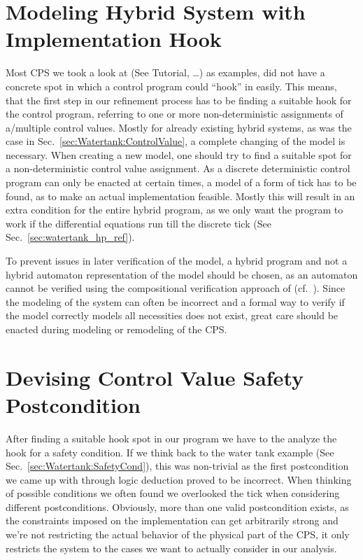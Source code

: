 \section{Modeling Hybrid System with Implementation Hook}
\label{sec:Process:Hook}
Most CPS we took a look at (See \cite{keymaera} Tutorial, \cite[p.~5, p.~11]{platzer2010b} \dots) as examples, did not have a concrete spot in which a control program could ``hook'' in easily. This means, that the first step in our refinement process has to be finding a suitable hook for the control program, referring to one or more non-deterministic assignments of a/multiple control values. Mostly for already existing hybrid systems, as was the case in Sec.~\ref{sec:Watertank:ControlValue}, a complete changing of the model is necessary. When creating a new model, one should try to find a suitable spot for a non-deterministic control value assignment. As a discrete deterministic control program can only be enacted at certain times, a model of a form of tick has to be found, as to make an actual implementation feasible. Mostly this will result in an extra condition for the entire hybrid program, as we only want the program to work if the differential equations run till the discrete tick (See Sec.~\ref{sec:watertank_hp_ref}).

To prevent issues in later verification of the model, a hybrid program and not a hybrid automaton representation of the model should be chosen, as an automaton cannot be verified using the compositional verification approach of \keym(cf.~\cite[ch.~1.1.4]{platzer2010b}). Since the modeling of the system can often be incorrect and a formal way to verify if the model correctly models all necessities does not exist, great care should be enacted during modeling or remodeling of the CPS.

\section{Devising Control Value Safety Postcondition}
\label{sec:Process:SafetyCond}

After finding a suitable hook spot in our program we have to the analyze the hook for a safety condition. If we think back to the water tank example (See Sec.~\ref{sec:Watertank:SafetyCond}), this was non-trivial as the first postcondition we came up with through logic deduction proved to be incorrect. When thinking of possible conditions we often found we overlooked the tick when considering different postconditions. Obviously, more than one valid postcondition exists, as the constraints imposed on the implementation can get arbitrarily strong and we're not restricting the actual behavior of the physical part of the CPS, it only restricts the system to the cases we want to actually consider in our analysis.

